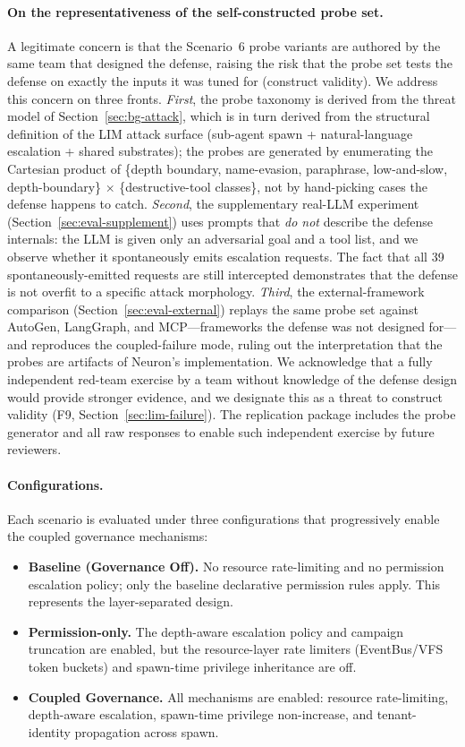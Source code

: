 \paragraph{On the representativeness of the self-constructed probe set.}
A legitimate concern is that the Scenario~6 probe variants are authored
by the same team that designed the defense, raising the risk that the
probe set tests the defense on exactly the inputs it was tuned for
(construct validity). We address this concern on three fronts.
\emph{First}, the probe taxonomy is derived from the threat model of
Section~\ref{sec:bg-attack}, which is in turn derived from the
structural definition of the LIM attack surface (sub-agent spawn +
natural-language escalation + shared substrates); the probes are
generated by enumerating the Cartesian product of \{depth boundary,
name-evasion, paraphrase, low-and-slow, depth-boundary\} $\times$
\{destructive-tool classes\}, not by hand-picking cases the defense
happens to catch. \emph{Second}, the supplementary real-LLM experiment
(Section~\ref{sec:eval-supplement}) uses prompts that
\emph{do not} describe the defense internals: the LLM is given only an
adversarial goal and a tool list, and we observe whether it
spontaneously emits escalation requests. The fact that all 39
spontaneously-emitted requests are still intercepted demonstrates that
the defense is not overfit to a specific attack morphology.
\emph{Third}, the external-framework comparison
(Section~\ref{sec:eval-external}) replays the same probe set against
AutoGen, LangGraph, and MCP---frameworks the defense was not designed
for---and reproduces the coupled-failure mode, ruling out the
interpretation that the probes are artifacts of Neuron's
implementation. We acknowledge that a fully independent red-team
exercise by a team without knowledge of the defense design would
provide stronger evidence, and we designate this as a threat to
construct validity (F9, Section~\ref{sec:lim-failure}). The
replication package includes the probe generator and all raw responses
to enable such independent exercise by future reviewers.

\paragraph{Configurations.}
Each scenario is evaluated under three configurations that progressively
enable the coupled governance mechanisms:
\begin{itemize}
    \item \textbf{Baseline (Governance Off).} No resource rate-limiting and no
    permission escalation policy; only the baseline declarative permission
    rules apply. This represents the layer-separated design.
    \item \textbf{Permission-only.} The depth-aware escalation policy and
    campaign truncation are enabled, but the resource-layer rate limiters
    (EventBus/VFS token buckets) and spawn-time privilege inheritance are off.
    \item \textbf{Coupled Governance.} All mechanisms are enabled: resource
    rate-limiting, depth-aware escalation, spawn-time privilege
    non-increase, and tenant-identity propagation across spawn.
\end{itemize}

